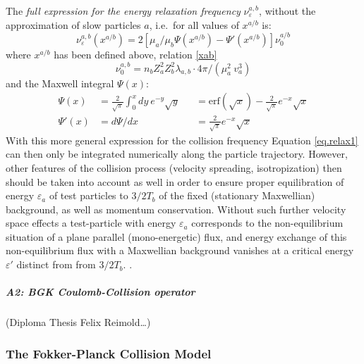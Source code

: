 \vspace{1cm}
The \emph{full expression for the energy relaxation frequency}
$\nu_\varepsilon^{a,b}$, without the approximation of slow particles $a$, i.e.\
for all values of $x^{a/b}$ is:
\begin{equation}
  \label{eps2}
  \nu_\varepsilon^{a,b}
  (x^{a/b}) =2 \left[\mu_a/\mu_b \Psi(x^{a/b}) - \Psi'(x^{a/b})\right]
  \nu_0^{a/b}
\end{equation}
where $x^{a/b}$ has been defined above, relation
\cref{xab}
\begin{equation}
  \nu_0^{a,b} = n_b Z_a^2 Z_b^2\lambda_{a,b}\cdot 4
  \pi  /(\mu_a^2~  v_a^3)
\end{equation}
and the Maxwell integral $\Psi(x)$:
\begin{align}
  \Psi(x)  & = \frac{2}{\sqrt{\pi}}\int_0^x dy~e^{-y} \sqrt{y} &  & =
  \mathrm{erf}
  (\sqrt{x})-\frac{2}{\sqrt{\pi}}e^{-x}\sqrt{x}                       \\
  \Psi'(x) & = d\Psi/dx                                        &  & =
  \frac{2}{\sqrt{\pi}}e^{-x}\sqrt{x}
\end{align}
With this more general expression for the collision frequency Equation
\cref{eq.relax1} can then only be integrated numerically  along the particle
trajectory.
However, other features of the collision process (velocity spreading,
isotropization) then should be taken into account as well in order to ensure
proper equilibration of energy $\varepsilon_a$ of test particles to $3/2 T_b$
of the fixed (stationary Maxwellian) background, as well as momentum
conservation.
Without such further velocity space effects a test-particle with energy
$\varepsilon_a$ corresponds to the non-equilibrium situation of a plane
parallel (mono-energetic) flux, and energy exchange of this non-equilibrium
flux with a Maxwellian background vanishes at a critical energy $\varepsilon'$
distinct from from $3/2 T_b$.
\cite[paragraph 19]{kn:Trubnikov}.
\subparagraph{A2: \ac{BGK} Coulomb-Collision operator}\hfill 

(Diploma Thesis Felix Reimold\dots) 

\subsubsection{The Fokker-Planck Collision Model} 

